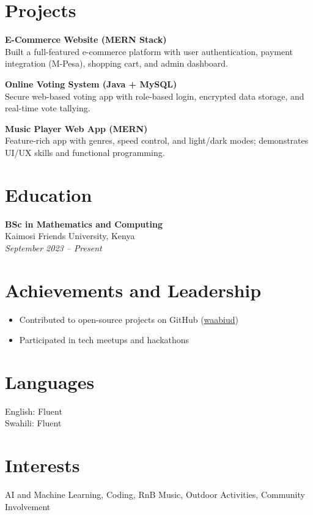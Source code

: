 \documentclass[a4paper,10pt]{article}
\begin{document}
\section*{Projects}
\textbf{E-Commerce Website (MERN Stack)} \\
Built a full-featured e-commerce platform with user authentication, payment integration (M-Pesa), shopping cart, and admin dashboard.

\textbf{Online Voting System (Java + MySQL)} \\
Secure web-based voting app with role-based login, encrypted data storage, and real-time vote tallying.

\textbf{Music Player Web App (MERN)} \\
Feature-rich app with genres, speed control, and light/dark modes; demonstrates UI/UX skills and functional programming.

\section*{Education}
\textbf{BSc in Mathematics and Computing} \\
Kaimosi Friends University, Kenya \\
\textit{September 2023 – Present}

\section*{Achievements and Leadership}
\begin{itemize}[leftmargin=*]
    \item Contributed to open-source projects on GitHub (\href{https://github.com/waabiud}{waabiud})
    \item Participated in tech meetups and hackathons
\end{itemize}

\section*{Languages}
English: Fluent \\
Swahili: Fluent

\section*{Interests}
AI and Machine Learning, Coding, RnB Music, Outdoor Activities, Community Involvement
\end{document}
